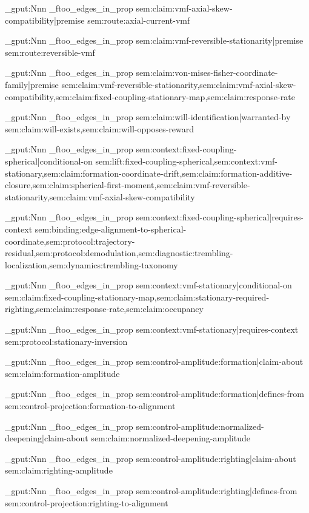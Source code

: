 \prop_gput:Nnn \g_ftoo_edges_in_prop { sem:claim:vmf-axial-skew-compatibility|premise } { sem:route:axial-current-vmf }

\prop_gput:Nnn \g_ftoo_edges_in_prop { sem:claim:vmf-reversible-stationarity|premise } { sem:route:reversible-vmf }

\prop_gput:Nnn \g_ftoo_edges_in_prop { sem:claim:von-mises-fisher-coordinate-family|premise } { sem:claim:vmf-reversible-stationarity,sem:claim:vmf-axial-skew-compatibility,sem:claim:fixed-coupling-stationary-map,sem:claim:response-rate }

\prop_gput:Nnn \g_ftoo_edges_in_prop { sem:claim:will-identification|warranted-by } { sem:claim:will-exists,sem:claim:will-opposes-reward }

\prop_gput:Nnn \g_ftoo_edges_in_prop { sem:context:fixed-coupling-spherical|conditional-on } { sem:lift:fixed-coupling-spherical,sem:context:vmf-stationary,sem:claim:formation-coordinate-drift,sem:claim:formation-additive-closure,sem:claim:spherical-first-moment,sem:claim:vmf-reversible-stationarity,sem:claim:vmf-axial-skew-compatibility }

\prop_gput:Nnn \g_ftoo_edges_in_prop { sem:context:fixed-coupling-spherical|requires-context } { sem:binding:edge-alignment-to-spherical-coordinate,sem:protocol:trajectory-residual,sem:protocol:demodulation,sem:diagnostic:trembling-localization,sem:dynamics:trembling-taxonomy }

\prop_gput:Nnn \g_ftoo_edges_in_prop { sem:context:vmf-stationary|conditional-on } { sem:claim:fixed-coupling-stationary-map,sem:claim:stationary-required-righting,sem:claim:response-rate,sem:claim:occupancy }

\prop_gput:Nnn \g_ftoo_edges_in_prop { sem:context:vmf-stationary|requires-context } { sem:protocol:stationary-inversion }

\prop_gput:Nnn \g_ftoo_edges_in_prop { sem:control-amplitude:formation|claim-about } { sem:claim:formation-amplitude }

\prop_gput:Nnn \g_ftoo_edges_in_prop { sem:control-amplitude:formation|defines-from } { sem:control-projection:formation-to-alignment }

\prop_gput:Nnn \g_ftoo_edges_in_prop { sem:control-amplitude:normalized-deepening|claim-about } { sem:claim:normalized-deepening-amplitude }

\prop_gput:Nnn \g_ftoo_edges_in_prop { sem:control-amplitude:righting|claim-about } { sem:claim:righting-amplitude }

\prop_gput:Nnn \g_ftoo_edges_in_prop { sem:control-amplitude:righting|defines-from } { sem:control-projection:righting-to-alignment }

